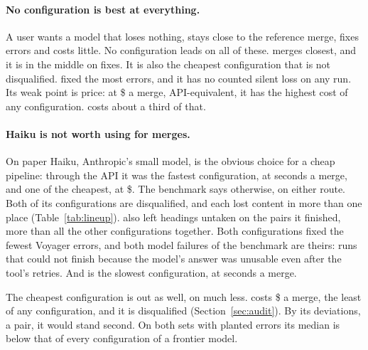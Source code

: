 

\paragraph{No configuration is best at everything.} A user wants a model that loses nothing, stays close to the reference merge, fixes errors and costs little. No configuration leads on all of these. \texttt{} merges closest, and it is in the middle on fixes. It is also the cheapest configuration that is not disqualified. \texttt{} fixed the most errors, and it has no counted silent loss on any run. Its weak point is price: at \$ a merge, API-equivalent, it has the highest cost of any configuration. \texttt{} costs about a third of that.

\paragraph{Haiku is not worth using for merges.} On paper Haiku, Anthropic's small model, is the obvious choice for a cheap pipeline: through the API it was the fastest configuration, at  seconds a merge, and one of the cheapest, at \$. The benchmark says otherwise, on either route. Both of its configurations are disqualified, and each lost content in more than one place (Table~\ref{tab:lineup}). \texttt{} also left  headings untaken on the  pairs it finished, more than all the other configurations together. Both configurations fixed the fewest Voyager errors, and both model failures of the benchmark are theirs: runs that could not finish because the model's answer was unusable even after the tool's retries. And \texttt{} is the slowest configuration, at  seconds a merge.

The cheapest configuration is out as well, on much less. \texttt{} costs \$ a merge, the least of any configuration, and it is disqualified (Section~\ref{sec:audit}). By its deviations,  a pair, it would stand second. On both sets with planted errors its median is below that of every configuration of a frontier model.

